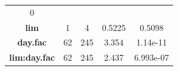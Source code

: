 \documentclass[]{article}
\begin{document}
\begin{longtable}[]{@{}ccccc@{}}
\begin{minipage}[t]{0.12\columnwidth}
0\strut
\end{minipage}\tabularnewline
\begin{minipage}[t]{0.21\columnwidth}\centering\strut
\textbf{lim}\strut
\end{minipage} & \begin{minipage}[t]{0.10\columnwidth}\centering\strut
1\strut
\end{minipage} & \begin{minipage}[t]{0.10\columnwidth}\centering\strut
4\strut
\end{minipage} & \begin{minipage}[t]{0.12\columnwidth}\centering\strut
0.5225\strut
\end{minipage} & \begin{minipage}[t]{0.12\columnwidth}\centering\strut
0.5098\strut
\end{minipage}\tabularnewline
\begin{minipage}[t]{0.21\columnwidth}\centering\strut
\textbf{day.fac}\strut
\end{minipage} & \begin{minipage}[t]{0.10\columnwidth}\centering\strut
62\strut
\end{minipage} & \begin{minipage}[t]{0.10\columnwidth}\centering\strut
245\strut
\end{minipage} & \begin{minipage}[t]{0.12\columnwidth}\centering\strut
3.354\strut
\end{minipage} & \begin{minipage}[t]{0.12\columnwidth}\centering\strut
1.14e-11\strut
\end{minipage}\tabularnewline
\begin{minipage}[t]{0.21\columnwidth}\centering\strut
\textbf{lim:day.fac}\strut
\end{minipage} & \begin{minipage}[t]{0.10\columnwidth}\centering\strut
62\strut
\end{minipage} & \begin{minipage}[t]{0.10\columnwidth}\centering\strut
245\strut
\end{minipage} & \begin{minipage}[t]{0.12\columnwidth}\centering\strut
2.437\strut
\end{minipage} & \begin{minipage}[t]{0.12\columnwidth}\centering\strut
6.993e-07\strut
\end{minipage}\tabularnewline
\bottomrule
\end{longtable}
\end{document}

